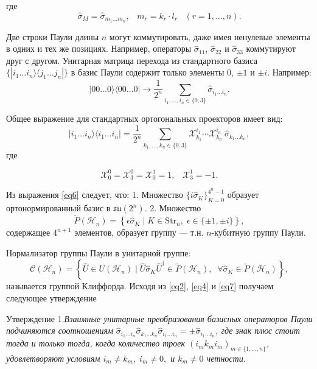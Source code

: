 \documentclass[a4paper]{report}
\begin{document}
\noindent где
\begin{equation}\label{eq7}
    \hat{\sigma}_M = \hat{\sigma}_{m_1\ldots m_n}, \;\;\; m_r = k_r \cdot l_r \;\;\; (r = 1,\ldots,n).
\end{equation}

Две строки Паули длины ${n}$ могут коммутировать, даже имея ненулевые элементы в одних и тех же позициях. Например, операторы ${\hat{\sigma}_{11}}$, ${\hat{\sigma}_{22}}$ и ${\hat{\sigma}_{33}}$ коммутируют друг с другом. Унитарная матрица перехода из стандартного базиса ${\{|i_1\ldots i_n\rangle\langle j_1\ldots j_n|\}}$ в базис Паули содержит только элементы ${0}$, ${\pm 1}$ и ${\pm i}$. Например:
$$
|00\ldots0\rangle\langle00\ldots0| \rightarrow \frac{1}{2^n} \sum_{i_1,\ldots,i_n \in \{0,3\}} \hat{\sigma}_{i_1\ldots i_n}.
$$

Общее выражение для стандартных ортогональных проекторов имеет вид:
$$
|i_1\ldots i_n\rangle\langle i_1\ldots i_n| = \frac{1}{2^n} \sum_{k_1,\ldots,k_n \in \{0,3\}} \mathcal{X}^{i_1}_{k_1} \cdots \mathcal{X}^{i_n}_{k_n} \: \hat{\sigma}_{k_1\ldots k_n},
$$
\noindent где

$${
            \mathcal{X}^0_0=\mathcal{X}^0_3=\mathcal{X}^1_0=1,\;\;\;\mathcal{X}^1_3 = -1.
        }$$

Из выражения \eqref{eq6} следует, что:
1. Множество ${\{i\hat{\sigma}_K\}_{K=0}^{4^n-1}}$ образует ортонормированный базис в ${\mathfrak{su}(2^n)}$.
2. Множество
$${
    \widetilde{P}(\mathcal{H}_n) = \left\{\epsilon\hat{\sigma}_K \mid K \in \mathrm{Str}_n,\; \epsilon \in \{\pm1, \pm i\}\right\},
}$$
\noindent содержащее ${4^{n+1}}$ элементов, образует группу — т.н. ${n}$-кубитную группу Паули.

Нормализатор группы Паули в унитарной группе:
$${
    \mathcal{C}(\mathcal{H}_n) = \left\{\hat{U} \in U(\mathcal{H}_n) \mid \hat{U}\hat{\sigma}_K\hat{U}^\dagger \in \widetilde{P}(\mathcal{H}_n),\;\; \forall \hat{\sigma}_K \in \widetilde{P}(\mathcal{H}_n)\right\},
}$$
\noindent называется группой Клиффорда. Исходя из \eqref{eq2}, \eqref{eq4} и \eqref{eq7} получаем следующее утверждение

\textsf{Утверждение 1.}\textit{Взаимные унитарные преобразования базисных операторов Паули подчиняются соотношениям ${\hat{\sigma}_{i_1\ldots i_n}\hat{\sigma}_{k_1\ldots k_n}\hat{\sigma}_{i_1\ldots i_n}=\pm\hat{\sigma}_{i_1\ldots i_n}}$, где знак плюс стоит тогда и только тогда, когда количество троек ${(i_m k_m i_m)_{m\in\{1,\ldots,n\}}}$, удовлетворяют условиям ${i_m\neq k_m},\;i_m\neq0,$ и ${k_m\neq0}$ четности}.
\end{document}
